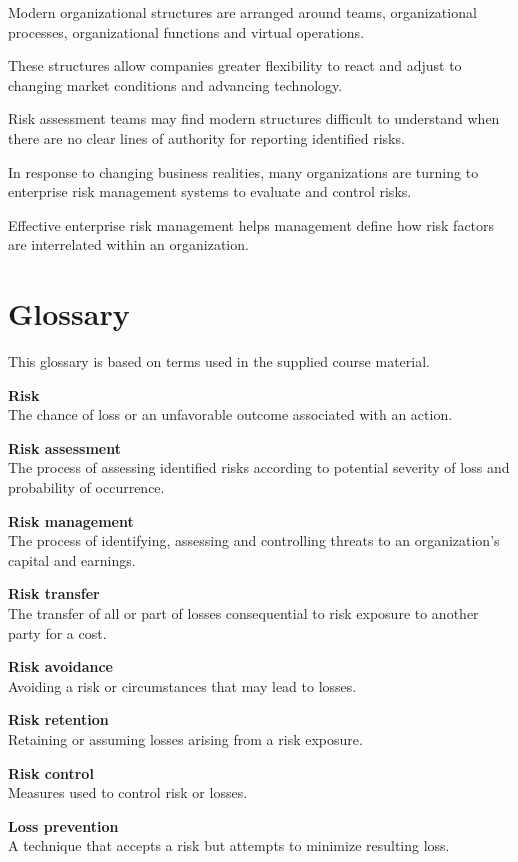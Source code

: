 \documentclass[
]{book}
\begin{document}
Modern organizational structures are arranged around teams, organizational processes, organizational functions and virtual operations.

These structures allow companies greater flexibility to react and adjust to changing market conditions and advancing technology.

Risk assessment teams may find modern structures difficult to understand when there are no clear lines of authority for reporting identified risks.

In response to changing business realities, many organizations are turning to enterprise risk management systems to evaluate and control risks.

Effective enterprise risk management helps management define how risk factors are interrelated within an organization.

\chapter{Glossary}\label{glossary}

This glossary is based on terms used in the supplied course material.

\textbf{Risk}\\
The chance of loss or an unfavorable outcome associated with an action.

\textbf{Risk assessment}\\
The process of assessing identified risks according to potential severity of loss and probability of occurrence.

\textbf{Risk management}\\
The process of identifying, assessing and controlling threats to an organization's capital and earnings.

\textbf{Risk transfer}\\
The transfer of all or part of losses consequential to risk exposure to another party for a cost.

\textbf{Risk avoidance}\\
Avoiding a risk or circumstances that may lead to losses.

\textbf{Risk retention}\\
Retaining or assuming losses arising from a risk exposure.

\textbf{Risk control}\\
Measures used to control risk or losses.

\textbf{Loss prevention}\\
A technique that accepts a risk but attempts to minimize resulting loss.
\end{document}
